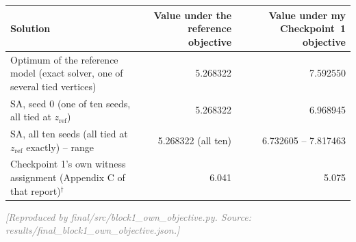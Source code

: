 \documentclass[11pt,a4paper]{article}
\newcommand{\hint}[1]{\textcolor{gray}{\textit{[#1]}}}
\newcommand{\zref}{z_{\mathrm{ref}}}
\begin{document}
\begin{tabularx}{\textwidth}{@{}Xrr@{}}
\toprule
Solution & Value under the reference objective & Value under my Checkpoint~1 objective\\
\midrule
Optimum of the reference model (exact solver, one of several tied vertices) & 5.268322 & 7.592550\\
SA, seed 0 (one of ten seeds, all tied at $\zref$) & 5.268322 & 6.968945\\
SA, all ten seeds (all tied at $\zref$ exactly) -- range & 5.268322 (all ten) & 6.732605 -- 7.817463\\
Checkpoint 1's own witness assignment (Appendix C of that report)$^\dagger$ & 6.041 & 5.075\\
\bottomrule
\end{tabularx}


{\small\hint{Reproduced by final/src/block1\_own\_objective.py. Source: results/final\_block1\_own\_objective.json.}}
\end{document}
